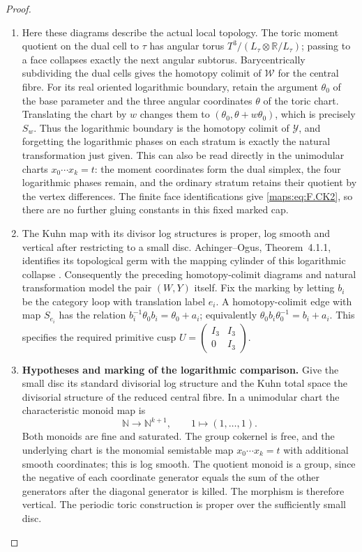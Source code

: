 \begin{proof}
\begin{enumerate}[label=\arabic*.]
\item Here these diagrams describe the actual local topology.
The toric moment quotient on the dual cell to $\tau$ has
angular torus $T^3/(L_\tau\otimes\mathbb R/L_\tau)$;
passing to a face collapses exactly the next angular
subtorus.  Barycentrically subdividing the dual cells gives
the homotopy colimit of $\mathcal W$ for the central fibre.
For its real oriented logarithmic boundary, retain the
argument $\theta_0$ of the base parameter and the three
angular coordinates $\theta$ of the toric chart.  Translating
the chart by $w$ changes them to
$(\theta_0,\theta+w\theta_0)$, which is precisely $S_w$.
Thus the logarithmic boundary is the homotopy colimit of
$\mathcal Y$, and forgetting the logarithmic phases on each
stratum is exactly the natural transformation just given.
This can also be read directly in the unimodular charts
$x_0\cdots x_k=t$: the moment coordinates form the dual
simplex, the four logarithmic phases remain, and the ordinary
stratum retains their quotient by the vertex differences.
The finite face identifications give \eqref{maps:eq:F.CK2}, so there are
no further gluing constants in this fixed marked cap.

\item The Kuhn map with its divisor log structures is proper,
log smooth and vertical after restricting to a small disc.
Achinger--Ogus, Theorem~4.1.1, identifies its topological germ
with the mapping cylinder of this logarithmic collapse
\cite[Theorem 4.1.1 and Lemmas 4.1.2--4.1.3, pp.~480--482]{ffAchingerOgus20}.  Consequently the preceding
homotopy-colimit diagrams and natural transformation model
the pair $(W,Y)$ itself.  Fix the marking by letting $b_i$
be the category loop with translation label $e_i$.  A
homotopy-colimit edge with map $S_{e_i}$ has the relation
$b_i^{-1}\theta_0b_i=\theta_0+a_i$; equivalently
$\theta_0b_i\theta_0^{-1}=b_i+a_i$.  This specifies the
required primitive cusp
$U=\begin{pmatrix}I_3&I_3\\0&I_3\end{pmatrix}$.

\item \par\medskip\noindent\textbf{Hypotheses and marking of the logarithmic comparison.}\quad 
\label{maps:mapsF:repair:log-cylinder-scope}
Give the small disc its standard divisorial log structure and
the Kuhn total space the divisorial structure of the reduced
central fibre.  In a unimodular chart the characteristic
monoid map is
\[
 \mathbb N\longrightarrow\mathbb N^{k+1},\qquad
 1\longmapsto(1,\ldots,1).
\]
Both monoids are fine and saturated.  The group cokernel is
free, and the underlying chart is the monomial semistable
map $x_0\cdots x_k=t$ with additional smooth coordinates;
this is log smooth.  The quotient monoid is a group, since
the negative of each coordinate generator equals the sum of
the other generators after the diagonal generator is killed.
The morphism is therefore vertical.  The periodic toric
construction is proper over the sufficiently small disc.


\end{enumerate}
\end{proof}
